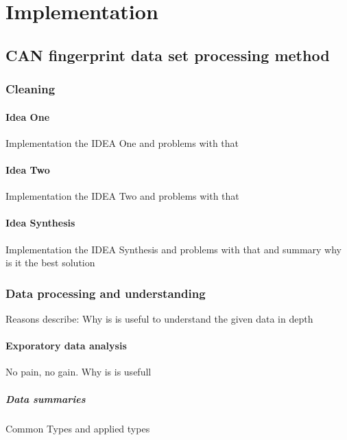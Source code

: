 \chapter{Implementation}
\section{CAN fingerprint data set processing method}
\subsection{Cleaning}
		\subsubsection{Idea One}
		Implementation the IDEA One and problems with that
		\subsubsection{Idea Two}
		Implementation the IDEA Two and problems with that
		\subsubsection{Idea Synthesis}
		Implementation the IDEA Synthesis and problems with that and summary why is it the best solution
\subsection{Data processing and understanding}
		Reasons describe: Why is is useful to understand the given data in depth
	\subsubsection{Exporatory data analysis}
		No pain, no gain. Why is is usefull
		\paragraph{Data summaries}
		Common Types and applied types
